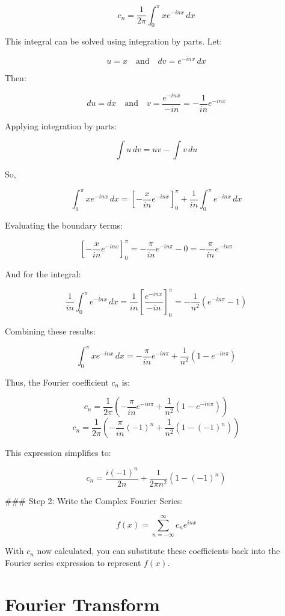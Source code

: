 \[ c_n = \frac{1}{2\pi} \int_{0}^{\pi} x e^{-inx} \, dx \]

This integral can be solved using integration by parts. Let:

\[ u = x \quad \text{and} \quad dv = e^{-inx} \, dx \]

Then:

\[ du = dx \quad \text{and} \quad v = \frac{e^{-inx}}{-in} = -\frac{1}{in} e^{-inx} \]

Applying integration by parts:

\[ \int u \, dv = uv - \int v \, du \]

So,

\[ \int_{0}^{\pi} x e^{-inx} \, dx = \left[ -\frac{x}{in} e^{-inx} \right]_{0}^{\pi} + \frac{1}{in} \int_{0}^{\pi} e^{-inx} \, dx \]

Evaluating the boundary terms:

\[ \left[ -\frac{x}{in} e^{-inx} \right]_{0}^{\pi} = -\frac{\pi}{in} e^{-in\pi} - 0 = -\frac{\pi}{in} e^{-in\pi} \]

And for the integral:

\[ \frac{1}{in} \int_{0}^{\pi} e^{-inx} \, dx = \frac{1}{in} \left[ \frac{e^{-inx}}{-in} \right]_{0}^{\pi} = -\frac{1}{n^2} \left( e^{-in\pi} - 1 \right) \]

Combining these results:

\[ \int_{0}^{\pi} x e^{-inx} \, dx = -\frac{\pi}{in} e^{-in\pi} + \frac{1}{n^2} (1 - e^{-in\pi}) \]

Thus, the Fourier coefficient \( c_n \) is:

\[ c_n = \frac{1}{2\pi} \left( -\frac{\pi}{in} e^{-in\pi} + \frac{1}{n^2} (1 - e^{-in\pi}) \right) \]
\[ c_n = \frac{1}{2\pi} \left( -\frac{\pi}{in} (-1)^n + \frac{1}{n^2} (1 - (-1)^n) \right) \]

This expression simplifies to:

\[ c_n = \frac{i(-1)^n}{2n} + \frac{1}{2\pi n^2} (1 - (-1)^n) \]

### Step 2: Write the Complex Fourier Series:

\[ f(x) = \sum_{n=-\infty}^{\infty} c_n e^{inx} \]

With \( c_n \) now calculated, you can substitute these coefficients back into the Fourier series expression to represent \( f(x) \).

\section{Fourier Transform}
\label{sec:fourier_transform}

